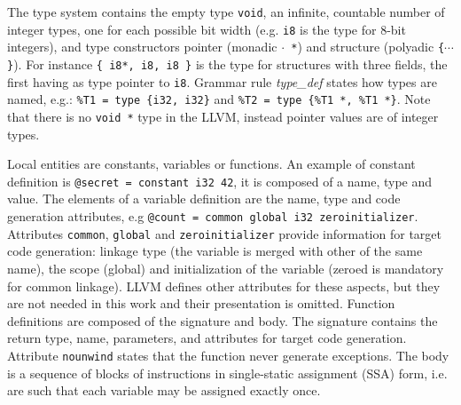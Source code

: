 \documentclass{llncs}
\newcommand{\llvm}[1]{\texttt{#1}}
\newcommand{\nt}[1]{{\normalfont\textit{#1}}}
\begin{document}
The type system contains the empty type \llvm{void}, an infinite, countable
number of integer types, one for each possible bit width (e.g. \llvm{i8} is the
type for 8-bit integers), and type constructors pointer (monadic \llvm{$\cdot$
  *}) and structure (polyadic \llvm{\{$\cdots$\}}). For instance \llvm{\{ i8*,
  i8, i8 \}} is the type for structures with three fields, the first having as
type pointer to \llvm{i8}. Grammar rule \nt{type\_def} states how types are
named, e.g.: \llvm{\%T1 = type \{i32, i32\}} and \llvm{\%T2 = type \{\%T1 *,
  \%T1 *\}}. Note that there is no \llvm{void *} type in the LLVM, instead
pointer values are of integer types. 

Local entities are constants, variables or functions. An example of constant
definition is \llvm{@secret = constant i32 42}, it is composed of a name, type
and value. The elements of a variable definition are the name, type and code
generation attributes, e.g \llvm{@count = common global i32 zeroinitializer}.
Attributes \llvm{common}, \llvm{global} and \llvm{zeroinitializer} provide
information for target code generation: linkage type (the variable is merged
with other of the same name), the scope (global) and initialization of the
variable (zeroed is mandatory for common linkage). LLVM defines other attributes
for these aspects, but they are not needed in this work and their presentation
is omitted.  Function definitions are composed of the signature and body. The
signature contains the return type, name, parameters, and attributes for target
code generation. Attribute \llvm{nounwind} states that the function never
generate exceptions. The body is a sequence of blocks of instructions in
single-static assignment (SSA) form, i.e. are such that each variable may be
assigned exactly once.
\end{document}
